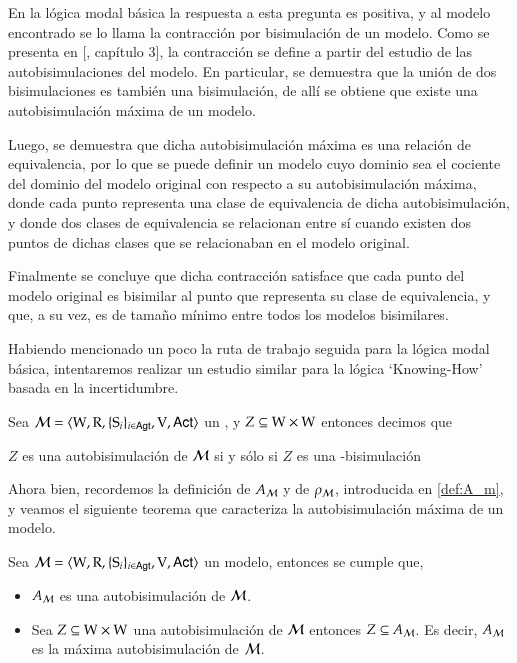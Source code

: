 En la lógica modal básica la respuesta a esta pregunta es positiva, y al modelo encontrado se lo llama la contracción por bisimulación de un modelo.
Como se presenta en [\cite{HandbookModalLogic}, capítulo 3], la contracción se define a partir del estudio de las autobisimulaciones del modelo. En particular,
se demuestra que la unión de dos bisimulaciones es también una bisimulación, de allí se obtiene que existe una autobisimulación máxima de un modelo.

Luego, se demuestra que dicha autobisimulación máxima es una relación de equivalencia, por lo que se puede definir un modelo cuyo dominio sea el cociente
del dominio del modelo original con respecto a su autobisimulación máxima, donde cada punto representa una clase de equivalencia de dicha autobisimulación, y donde 
dos clases de equivalencia se relacionan entre sí cuando existen dos puntos de dichas clases que se relacionaban en el modelo original.

Finalmente se concluye que dicha contracción satisface que cada punto del modelo original es bisimilar al punto que representa su clase de equivalencia, y 
que, a su vez, es de tamaño mínimo entre todos los modelos bisimilares.

Habiendo mencionado un poco la ruta de trabajo seguida para la lógica modal básica, intentaremos realizar un estudio similar para la lógica `Knowing-How' basada en la 
incertidumbre.

\begin{definicion}
    Sea $\mathcal{M}=\langle \mathrm{W},\mathrm{R},\{ \mathrm{S}_i \}_{i \in {\rm \sf Agt}},\mathrm{V},{\rm \sf Act} \rangle$ un \ults, y $Z \subseteq \mathrm{W} \times \mathrm{W}$ entonces decimos que
    \begin{center}
        $Z$ es una autobisimulación de $\mathcal{M}$ si y sólo si $Z$ es una \KHilogic-bisimulación        
    \end{center}
\end{definicion}

Ahora bien, recordemos la definición de $A_{\mathcal{M}}$ y de $\rho_{\mathcal{M}}$, introducida en \ref{def:A_m}, y veamos el siguiente teorema 
que caracteriza la autobisimulación máxima de un modelo.

\begin{teorema}
    Sea $\mathcal{M}=\langle \mathrm{W},\mathrm{R},\{ \mathrm{S}_i \}_{i \in {\rm \sf Agt}},\mathrm{V},{\rm \sf Act} \rangle$ un modelo, entonces se cumple que,
    \begin{itemize}
        \item $A_{\mathcal{M}}$ es una autobisimulación de $\mathcal{M}$.
        \item Sea $Z \subseteq \mathrm{W} \times \mathrm{W}$ una autobisimulación de $\mathcal{M}$ entonces $Z \subseteq A_{\mathcal{M}}$. 
        Es decir, $A_{\mathcal{M}} $ es la máxima autobisimulación de $\mathcal{M}$. 
    \end{itemize}
\end{teorema}

